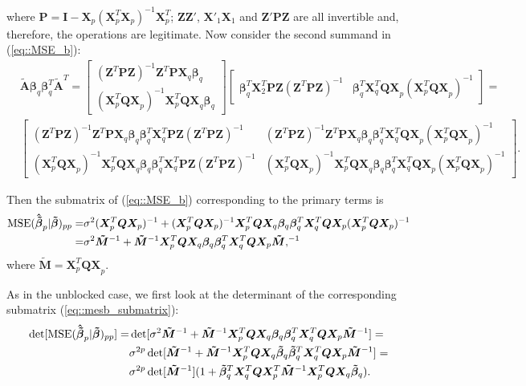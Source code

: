 where $\bm{P}=\bm{I}-\bm{X}_{p}(\bm{X}^T_{p}\bm{X}_{p})^{-1}\bm{X}^T_{p}$; $\bm{ZZ}'$, $\bm{X}'_{1}\bm{X}_{1}$ and $\bm{Z}'\bm{PZ}$ are all invertible and, therefore, the operations are legitimate. Now consider the second summand in (\ref{eq::MSE_b}):
\begin{align*}
&\bm{\tilde{A}}\bm{\beta}_q\bm{\beta}_q^T\bm{\tilde{A}}^T=
\begin{bmatrix}
(\bm{Z}^T\bm{PZ})^{-1}\bm{Z}^T\bm{PX}_{q}\bm{\beta}_q \\
(\bm{X}^T_{p}\bm{QX}_{p})^{-1}\bm{X}^T_{p}\bm{QX}_{q}\bm{\beta}_q
\end{bmatrix}
\begin{bmatrix}
\bm{\beta}^T_q\bm{X}^T_{2}\bm{PZ}(\bm{Z}^T\bm{PZ})^{-1} & \bm{\beta}^T_q\bm{X}^T_{q}\bm{QX}_{p}(\bm{X}^T_{p}\bm{QX}_{p})^{-1}
\end{bmatrix}=\\
&\begin{bmatrix}
(\bm{Z}^T\bm{PZ})^{-1}\bm{Z}^T\bm{PX}_{q}\bm{\beta}_q\bm{\beta}^T_q\bm{X}^T_{q}\bm{PZ}(\bm{Z}^T\bm{PZ})^{-1} & (\bm{Z}^T\bm{PZ})^{-1}\bm{Z}^T\bm{PX}_{q}\bm{\beta}_q\bm{\beta}^T_q\bm{X}^T_{q}\bm{QX}_{p}(\bm{X}^T_{p}\bm{QX}_{p})^{-1} \\
(\bm{X}^T_{p}\bm{QX}_{p})^{-1}\bm{X}^T_{p}\bm{QX}_{q}\bm{\beta}_q\bm{\beta}^T_q\bm{X}^T_{q}\bm{PZ}(\bm{Z}^T\bm{PZ})^{-1} & (\bm{X}^T_{p}\bm{QX}_{p})^{-1}\bm{X}^T_{p}\bm{QX}_{q}\bm{\beta}_q\bm{\beta}^T_q\bm{X}^T_{q}\bm{QX}_{p}(\bm{X}^T_{p}\bm{QX}_{p})^{-1}
\end{bmatrix}.
\end{align*}

Then the submatrix of (\ref{eq::MSE_b}) corresponding to the primary terms is
\begin{align}
\label{eq::mesb_submatrix}
\mbox{MSE}(\bm{\hat{\tilde{\beta}}}_p|\bm{\tilde{\beta}})_{pp}=& \sigma^2(\bm{X}^T_{p}\bm{QX}_{p})^{-1}+(\bm{X}^T_{p}\bm{QX}_{p})^{-1}\bm{X}^T_{p}\bm{QX}_{q}\bm{\beta}_q\bm{\beta}^T_q\bm{X}^T_{q}\bm{QX}_{p}(\bm{X}^T_{p}\bm{QX}_{p})^{-1}\notag\\=& \sigma^2\bm{\tilde{M}}^{-1}+\bm{\tilde{M}}^{-1}\bm{X}^T_{p}\bm{QX}_{q}\bm{\beta}_q\bm{\beta}^T_q\bm{X}^T_{q}\bm{QX}_{p}\bm{\tilde{M}},^{-1}
\end{align}
where $\bm{\tilde{M}}=\bm{X}^T_{p}\bm{QX}_{p}.$

As in the unblocked case, we first look at the determinant of the corresponding submatrix (\ref{eq::mesb_submatrix}): 
\begin{align}
\label{eq::MSE_B_det}
\det[\mbox{MSE}(\bm{\hat{\tilde{\beta}}}_p|\bm{\tilde{\beta}})_{pp}]=&\det[\sigma^2\bm{\tilde{M}}^{-1}+\bm{\tilde{M}}^{-1}\bm{X}^T_{p}\bm{QX}_{q}\bm{\beta}_q\bm{\beta}^T_q\bm{X}^T_{q}\bm{QX}_{p}\bm{\tilde{M}}^{-1}]=\notag\\& \sigma^{2p}\det[\bm{\tilde{M}}^{-1}+\bm{\tilde{M}}^{-1}\bm{X}^T_{p}\bm{QX}_{q}\bm{\tilde{\beta}}_q\bm{\tilde{\beta}}^T_q\bm{X}^T_{q}\bm{QX}_{p}\bm{\tilde{M}}^{-1}]=\notag\\& \sigma^{2p}\det[\bm{\tilde{M}}^{-1}](1+\bm{\tilde{\beta}}^T_q\bm{X}^T_{q}\bm{QX}^T_{p}\bm{\tilde{M}}^{-1}\bm{X}^T_{p}\bm{QX}_{q}\bm{\tilde{\beta}}_q).
\end{align}

